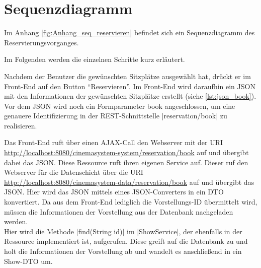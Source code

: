 \section{Sequenzdiagramm}
\label{sec:sequenzdiagram}
\authorsection{\authorSG}

Im Anhang \vref{fig:Anhang_seq_reservieren} befindet sich ein Sequenzdiagramm des Reservierungsvorganges.

Im Folgenden werden die einzelnen Schritte kurz erläutert.

Nachdem der Benutzer die gewünschten Sitzplätze ausgewählt hat, drückt er im Front-End auf den Button \enquote{Reservieren}.
Im Front-End wird daraufhin ein \acs{JSON} mit den Informationen der gewünschten Sitzplätze erstellt (siehe \vref{lst:json_book}).
Vor dem \acs{JSON} wird noch ein Formparameter book angeschlossen, um eine genauere Identifizierung in der \acs{REST}-Schnittstelle \jinline|reservation/book| zu realisieren.

Das Front-End ruft über einen \acs{AJAX}-Call den Webserver mit der \acs{URI}  \url{http://localhost:8080/cinemasystem-system/reservation/book} auf und übergibt dabei das \acs{JSON}.
Diese Ressource ruft ihren eigenen Service auf.
Dieser ruf den Webserver für die Datenschicht über die \acs{URI} \url{http://localhost:8080/cinemasystem-data/reservation/book} auf und übergibt das \acs{JSON}.
Hier wird das \acs{JSON} mittels eines \acs{JSON}-Converters in ein \acs{DTO} konvertiert.
Da aus dem Front-End lediglich die Vorstellungs-ID übermittelt wird, müssen die Informationen der Vorstellung aus der Datenbank nachgeladen werden. \\
Hier wird die Methode \jinline|find(String id)| im \jinline|ShowService|, der ebenfalls in der Ressource implementiert ist, aufgerufen.
Diese greift auf die Datenbank zu und holt die Informationen der Vorstellung ab und wandelt es anschließend in ein Show-\acs{DTO} um.


